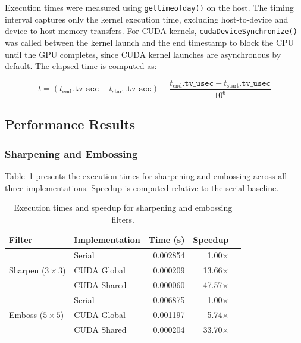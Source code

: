 Execution times were measured using \texttt{gettimeofday()} on the host. The timing interval captures only the kernel execution time, excluding host-to-device and device-to-host memory transfers. For CUDA kernels, \texttt{cudaDeviceSynchronize()} was called between the kernel launch and the end timestamp to block the CPU until the GPU completes, since CUDA kernel launches are asynchronous by default. The elapsed time is computed as:

\begin{equation}
t = (t_{\text{end}}.\texttt{tv\_sec} - t_{\text{start}}.\texttt{tv\_sec}) + \frac{t_{\text{end}}.\texttt{tv\_usec} - t_{\text{start}}.\texttt{tv\_usec}}{10^6}
\end{equation}

\subsection{Performance Results}

\subsubsection{Sharpening and Embossing}

Table~\ref{tab:sharpen_emboss} presents the execution times for sharpening and embossing across all three implementations. Speedup is computed relative to the serial baseline.

\begin{table}[h]
\centering
\caption{Execution times and speedup for sharpening and embossing filters.}
\label{tab:sharpen_emboss}
\begin{tabular}{llrrr}
\toprule
\textbf{Filter} & \textbf{Implementation} & \textbf{Time (s)} & \textbf{Speedup} \\
\midrule
\multirow{3}{*}{Sharpen ($3\times3$)}
  & Serial         & 0.002854 & 1.00$\times$ \\
  & CUDA Global    & 0.000209 & 13.66$\times$ \\
  & CUDA Shared    & 0.000060 & 47.57$\times$ \\
\midrule
\multirow{3}{*}{Emboss ($5\times5$)}
  & Serial         & 0.006875 & 1.00$\times$ \\
  & CUDA Global    & 0.001197 & 5.74$\times$ \\
  & CUDA Shared    & 0.000204 & 33.70$\times$ \\
\bottomrule
\end{tabular}
\end{table}

